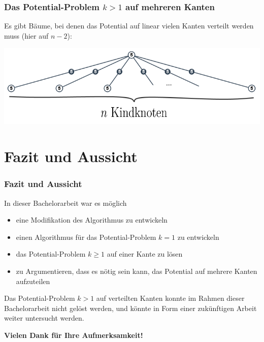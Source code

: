 \documentclass{beamer}
\begin{document}
	\begin{frame}
		\frametitle{Das Potential-Problem $k > 1$ auf mehreren Kanten}
		\large
		
		Es gibt Bäume, bei denen das Potential auf linear vielen Kanten verteilt werden muss (hier auf $n-2$):
		
			\includegraphics[width=\textwidth]{bilder/abb_bsp_potverteilen.png}
		
	\end{frame}

	\section{Fazit und Aussicht}
	\begin{frame}
		\frametitle{Fazit und Aussicht}
		\large
		
		In dieser Bachelorarbeit war es möglich
		\begin{itemize}
				\item eine Modifikation des Algorithmus zu entwickeln
				\item einen Algorithmus für das Potential-Problem $k = 1$ zu entwickeln
				\item das Potential-Problem $k \geq 1$ auf einer Kante zu lösen
				\item zu Argumentieren, dass es nötig sein kann, das Potential auf mehrere Kanten aufzuteilen
		\end{itemize}
		
	  	 Das Potential-Problem $k > 1$ auf verteilten Kanten konnte im Rahmen dieser Bachelorarbeit nicht gelöst werden, und könnte in Form einer zukünftigen Arbeit weiter untersucht werden.
		
	\end{frame}
	
	\begin{frame}
		\begin{center}
			\large \textbf{Vielen Dank für Ihre Aufmerksamkeit!}
		\end{center}
	\end{frame}
\end{document}
